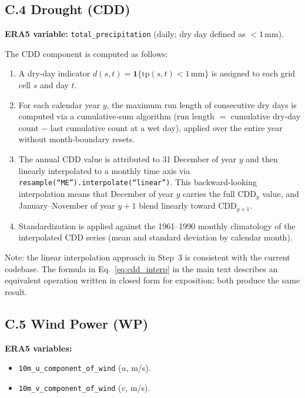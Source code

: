 \documentclass[12pt]{article}
\begin{document}
\subsection*{C.4 Drought (CDD)}
 
\noindent\textbf{ERA5 variable:} \texttt{total\_precipitation} (daily; dry day defined as $<1$\,mm).
 
The CDD component is computed as follows:
\begin{enumerate}
\item A dry-day indicator $d(s,t) = \mathbf{1}\{\mathrm{tp}(s,t) < 1\,\mathrm{mm}\}$ is assigned to each grid cell $s$ and day $t$.
\item For each calendar year $y$, the maximum run length of consecutive dry days is computed via a cumulative-sum algorithm (run length $= $ cumulative dry-day count $-$ last cumulative count at a wet day), applied over the entire year without month-boundary resets.
\item The annual CDD value is attributed to 31 December of year $y$ and then linearly interpolated to a monthly time axis via \texttt{resample(``ME'').interpolate(``linear'')}. This backward-looking interpolation means that December of year $y$ carries the full $\mathrm{CDD}_y$ value, and January--November of year $y+1$ blend linearly toward $\mathrm{CDD}_{y+1}$.
\item Standardization is applied against the 1961--1990 monthly climatology of the interpolated CDD series (mean and standard deviation by calendar month).
\end{enumerate}
Note: the linear interpolation approach in Step~3 is consistent with the current codebase. The formula in Eq.~\eqref{eq:cdd_interp} in the main text describes an equivalent operation written in closed form for exposition; both produce the same result.
 
\subsection*{C.5 Wind Power (WP)}
 
\noindent\textbf{ERA5 variables:}
\begin{itemize}
\item \texttt{10m\_u\_component\_of\_wind} ($u$, m/s).
\item \texttt{10m\_v\_component\_of\_wind} ($v$, m/s).
\end{itemize}
 
\end{document}
